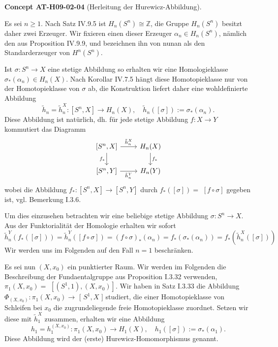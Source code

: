 \documentclass[10pt, letterpaper]{article}
\newcommand{\CustomHeading}[3]{%
  \par\medskip\noindent%
  \textbf{#1 #2} \textnormal{(#3)}.\enskip%
}
\newenvironment{CONC}[2]{\begin{unitbox}\CustomHeading{Concept}{#1}{#2}}{\end{unitbox}}
\begin{document}
\begin{CONC}{AT-H09-02-04}{Herleitung der Hurewicz-Abbildung}
Es sei $n \geq 1$. Nach Satz IV.9.5 ist $H_n\left(S^n\right) \cong \mathbb{Z}$, die Gruppe $H_n\left(S^n\right)$ besitzt daher zwei Erzeuger. Wir fixieren einen dieser Erzeuger $\alpha_n \in H_n\left(S^n\right)$, nämlich den aus Proposition IV.9.9, und bezeichnen ihn von nunan als den Standarderzeuger von $H^n\left(S^n\right)$.

Ist $\sigma: S^n \rightarrow X$ eine stetige Abbildung so erhalten wir eine Homologieklasse $\sigma_*\left(\alpha_n\right) \in H_n(X)$. Nach Korollar IV.7.5 hängt diese Homotopieklasse nur von der Homotopieklasse von $\sigma$ ab, die Konstruktion liefert daher eine wohldefinierte Abbildung
$$
\tilde{h}_n=\tilde{h}_n^X:\left[S^n, X\right] \rightarrow H_n(X), \quad \tilde{h}_n([\sigma]):=\sigma_*\left(\alpha_n\right) .
$$
Diese Abbildung ist natürlich, dh. für jede stetige Abbildung $f: X \rightarrow Y$ kommutiert das Diagramm
\[
\begin{tikzcd}
{[S^n, X]} \arrow[r, "\tilde{h}_n^X"] \arrow[d, "f_*"'] & H_n(X) \arrow[d, "f_*"] \\
{[S^n, Y]} \arrow[r, "\tilde{h}_n^Y"'] & H_n(Y)
\end{tikzcd}
\]
wobei die Abbildung $f_*:\left[S^n, X\right] \rightarrow\left[S^n, Y\right]$ durch $f_*([\sigma])=$ $[f \circ \sigma]$ gegeben ist, vgl. Bemerkung I.3.6. 

Um dies einzusehen betrachten wir eine beliebige stetige Abbildung $\sigma: S^n \rightarrow X$. Aus der Funktorialität der Homologie erhalten wir sofort 
$$\tilde{h}_n^Y\left(f_*([\sigma])\right)=\tilde{h}_n^Y([f \circ \sigma])=(f \circ \sigma)_*\left(\alpha_n\right)=f_*\left(\sigma_*\left(\alpha_n\right)\right)=f_*\left(\tilde{h}_n^X([\sigma])\right)$$ 
Wir werden uns im Folgenden auf den Fall $n=1$ beschränken.

Es sei nun $(X, x_0)$ ein punktierter Raum. Wir werden im Folgenden die Beschreibung der Fundaentalgruppe aus Proposition I.3.32 verwenden, $\pi_1\left(X, x_0\right)=$ $\left[\left(S^1, 1\right),\left(X, x_0\right)\right]$. Wir haben in Satz I.3.33 die Abbildung $\Phi_{\left(X, x_0\right)}: \pi_1\left(X, x_0\right) \rightarrow$ [ $S^1, X$ ] studiert, die einer Homotopieklasse von Schleifen bei $x_0$ die zugrundeliegende freie Homotopieklasse zuordnet. Setzen wir diese mit $\tilde{h}_1^X$ zusammen, erhalten wir eine Abbildung
$$
h_1=h_1^{\left(X, x_0\right)}: \pi_1\left(X, x_0\right) \rightarrow H_1(X), \quad h_1([\sigma]):=\sigma_*\left(\alpha_1\right) .
$$
Diese Abbildung wird der (erste) Hurewicz-Homomorphismus genannt.
\end{CONC}
\end{document}
